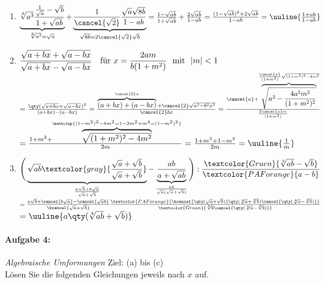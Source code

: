 \begin{enumerate}[label=(\alph*)]
    \item $\underbrace{\sqrt[6]{a^3}\dfrac{\frac{1}{\sqrt{a}}-\sqrt{b}}{1+\sqrt{ab}}}_{\sqrt[6]{a^3} = \sqrt{a}}+\underbrace{\dfrac{1}{\cancel{\sqrt{2}}}\dfrac{\sqrt{a}\sqrt{8b}}{1-ab}}_{\sqrt{8b} = 2\cancel{\sqrt{2}}\sqrt{b}} = \frac{1- \sqrt{ab}}{1+\sqrt{ab}} + \frac{2\sqrt{ab}}{1-ab} = \frac{(1-\sqrt{ab})^2 + 2\sqrt{ab}}{1-ab} =\uuline{\frac{1+ab}{1-ab}}$
    \item $\dfrac{\sqrt{a+bx}+\sqrt{a-bx}}{\sqrt{a+bx}-\sqrt{a-bx}} \quad \textnormal{für}\,\, x=\dfrac{2am}{b(1+m^2)}\,\,\textnormal{ mit }\,\, |m|<1$ \\[-10mm]
    $= \frac{\qty(\sqrt{a+bx}+\sqrt{a-bx})^2}{(a+bx)-(a-bx)} = \frac{\overbrace{(a+bx)+(a-bx)}^{\cancel{2}a} + \cancel{2}\sqrt{a^2 - b^2 x^2}}{\cancel{2}bx}= \frac{\cancel{a}+\overbrace{\sqrt{a^2 - \frac{4a^2 m^2}{(1+m^2)^2}}}^{\frac{\cancel{a}}{(1+m^2)}\sqrt{(1+m^2)^2- 4m^2}}}{\frac{2\cancel{a}m}{(1+m^2)}}$ \\[2mm]
    $= \frac{1+m^2 + \overbrace{\sqrt{(1+m^2)^2 - 4m^2}}^{\mathclap{(1-m^2)^2 - 4m^2 = 1 -2m^2 + m^4 = (1-m^2)^2}}}{2m} = \frac{1+m^2 +1 -m^2}{2m} = \uuline{\frac{1}{m}}$
    \item $\Bigg(\underbrace{\sqrt{ab} \textcolor{gray}{\frac{\sqrt{a}+\sqrt{b}}{\sqrt{a}+\sqrt{b}}}}_{\frac{a\sqrt{b}+b\sqrt{a}}{\sqrt{a}+\sqrt{b}}}-\underbrace{\dfrac{ab}{a+\sqrt{ab}}}_{\frac{ab}{\sqrt{a}(\sqrt{a}+\sqrt{b})}}\Bigg):\dfrac{\textcolor{Gruen}{\sqrt[4]{ab}-\sqrt{b}}}{\textcolor{PAForange}{a-b}} $\\
    $= \frac{a \sqrt{b} + \cancel{b\sqrt{a}} - \cancel{\sqrt{a}b}}{\bcancel{\sqrt{a}+\sqrt{b}}} \frac{\textcolor{PAForange}{\bcancel{\qty(\sqrt{a}+\sqrt{b})} \qty(\sqrt[4]{a}+\sqrt[4]{b})\cancel{\qty(\sqrt[4]{a}-\sqrt[4]{b})}}}{\textcolor{Gruen}{\sqrt[4]{b}\cancel{\qty(\sqrt[4]{a}-\sqrt[4]{b})}}}$\\
    $ = \uuline{a\qty(\sqrt[4]{ab}+\sqrt{b})}$
\end{enumerate}

%
\newpage
\paragraph{Aufgabe 4: } \emph{Algebraische Umformungen} \hfill Ziel: (a) bis (c)\\[0.2cm]
Lösen Sie die folgenden Gleichungen jeweils nach $x$ auf.

